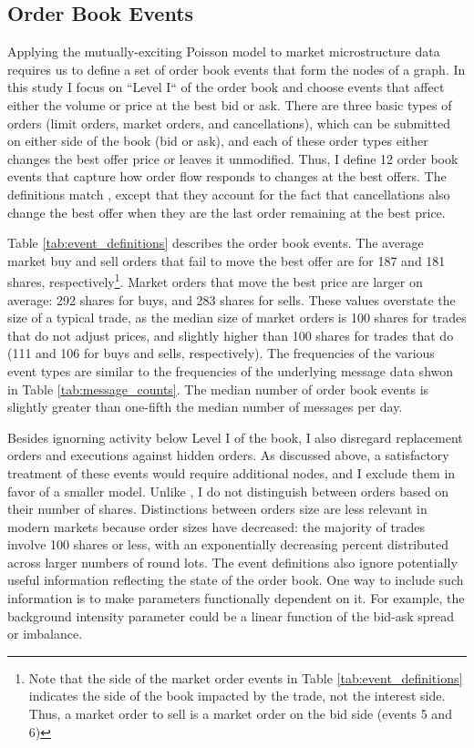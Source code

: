 	\subsection{Order Book Events}
		Applying the mutually-exciting Poisson model to market microstructure data requires us to define a set of order book events that form the nodes of a graph. In this study I focus on ``Level I`` of the order book and choose events that affect either the volume or price at the best bid or ask. There are three basic types of orders (limit orders, market orders, and cancellations), which can be submitted on either side of the book (bid or ask), and each of these order types either changes the best offer price or leaves it unmodified. Thus, I define 12 order book events that capture how order flow responds to changes at the best offers. The definitions match \cite{Large2007}, except that they account for the fact that cancellations also change the best offer when they are the last order remaining at the best price.

		Table \ref{tab:event_definitions} describes the order book events. The average market buy and sell orders that fail to move the best offer are for 187 and 181 shares, respectively\footnote{Note that the side of the market order events in Table \ref{tab:event_definitions} indicates the side of the book impacted by the trade, not the interest side. Thus, a market order to sell is a market order on the bid side (events 5 and 6)}. Market orders that move the best price are larger on average: 292 shares for buys, and 283 shares for sells. These values overstate the size of a typical trade, as the median size of market orders is 100 shares for trades that do not adjust prices, and slightly higher than 100 shares for trades that do (111 and 106 for buys and sells, respectively). The frequencies of the various event types are similar to the frequencies of the underlying message data shwon in Table \ref{tab:message_counts}. The median number of order book events is slightly greater than one-fifth the median number of messages per day.

		Besides ignorning activity below Level I of the book, I also disregard replacement orders and executions against hidden orders. As discussed above, a satisfactory treatment of these events would require additional nodes, and I exclude them in favor of a smaller model. Unlike \cite{Biais1995}, I do not distinguish between orders based on their number of shares. Distinctions between orders size are less relevant in modern markets because order sizes have decreased: the majority of trades involve 100 shares or less, with an exponentially decreasing percent distributed across larger numbers of round lots. The event definitions also ignore potentially useful information reflecting the state of the order book. One way to include such information is to make parameters functionally dependent on it. For example, the background intensity parameter could be a linear function of the bid-ask spread or imbalance.

